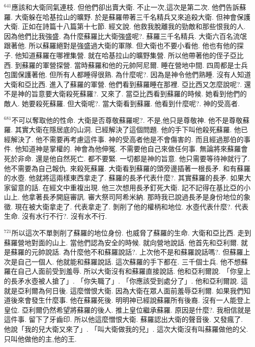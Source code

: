 \documentclass{book}
\begin{document}
$^{641}$應該和大衛同氣連枝.
但他們卻出賣大衛.
不止一次,這次是第二次.
他們告訴蘇羅.
大衛躲在哈基拉山的曠野.
於是蘇羅帶著三千名精兵又來追殺大衛.
但神會保護大衛.
正如在詩篇十八篇第十七節.
經文說.
他救我脫離我的勁敵和那些恨我的人.
因為他們比我強盛.
為什麼蘇羅比大衛強盛呢?.
蘇羅三千名精兵.
大衛六百名流氓跟著他.
所以蘇羅絕對是強盛過大衛的軍隊.
但大衛也不要小看他.
他也有他的探子.
他知道蘇羅在哪裡集營.
就在哈基拉山的曠野集營.
所以他帶著他的侄子亞比西.
到蘇羅的軍營探營.
當時蘇羅和他的元帥阿尼爾.
睡在營地中間.
四周都是士兵包圍保護著他.
但所有人都睡得很熟.
為什麼呢?.
因為是神令他們熟睡.
沒有人知道大衛和亞比西.
進入了蘇羅的軍營.
他們看到蘇羅睡在那裡.
亞比西又怎麼說呢?.
還不是神的旨意要大衛殺死蘇羅?.
又來了.
當亞比西看到蘇羅的時候.
她看到他們的敵人.
她要殺死蘇羅.
但大衛呢?.
當大衛看到蘇羅.
他看到什麼呢?.
神的受高者.

$^{681}$不可以奪取他的性命.
大衛是否尊敬蘇羅呢?.
不是,他只是尊敬神.
他不是尊敬蘇羅.
其實大衛在隱居底的山洞.
已經解決了這個問題.
他的手下叫他殺死蘇羅.
他已經解決了.
他不需要再考慮這件事.
神的受高者他是不會傷害的.
而且經過那伯的事件.
他知道神是掌權的.
神會為他伸冤.
不需要他自己來做任何事.
無論將來蘇羅會死於非命.
還是他自然死亡.
都不要緊.
一切都是神的旨意.
他只需要等待神就行了.
他不需要為自己報仇.
來殺死蘇羅.
大衛看到蘇羅的頭旁邊插著一根長矛.
和有蘇羅的水壺.
他就將這兩樣東西拿走了.
蘇羅的長矛代表什麼?.
其實蘇羅的長矛.
如果大家留意的話.
在經文中重複出現.
他三次想用長矛釘死大衛.
記不記得在基比亞的小山上.
他拿著長矛開庭審訊.
審大祭司阿希米納.
那時我已說過長矛是身份地位的象徵.
現在被大衛拿走了.
代表拿走了.
剝削了他的權柄和地位.
水壺代表什麼?.
代表生命.
沒有水行不行?.
沒有水不行.

$^{721}$所以這次不單剝削了蘇羅的地位身份.
也威脅了蘇羅的生命.
大衛和亞比西.
走到蘇羅營地對面的山上.
當他們認為安全的時候.
就向營地說話.
他首先和亞利爾.
就是蘇羅的元帥說話.
為什麼他不和蘇羅說話?.
上次他不是和蘇羅說話嗎?.
但蘇羅上次是自己一個人.
他就能和蘇羅說話.
這次蘇羅的手下都在.
三千個士兵.
他不想蘇羅在自己人面前受到羞辱.
所以大衛沒有和蘇羅直接說話.
他和亞利爾說.
「你皇上的長矛水壺被人搶了」.
「你失職了」.
「你應該受到處分了」.
他和亞利爾說.
這就是亞利爾為何日後.
這麼憎恨大衛.
因為大衛在眾人面前羞辱亞利爾.
如果我們知道後來會發生什麼事.
他在蘇羅死後.
明明神已經說蘇羅所有後裔.
沒有一人能登上皇位.
亞利爾仍然希望將蘇羅的後人.
推上皇位繼承蘇羅.
原因是什麼?.
我相信就是這件事.
留下了牙齒印.
所以他這麼憎恨大衛.
蘇羅認出大衛的聲音後.
又發瘋了.
他說「我的兒大衛又來了」.
「叫大衛做我的兒」.
這次大衛沒有叫蘇羅做他的父.
只叫他做他的主,他的王.
\end{document}

